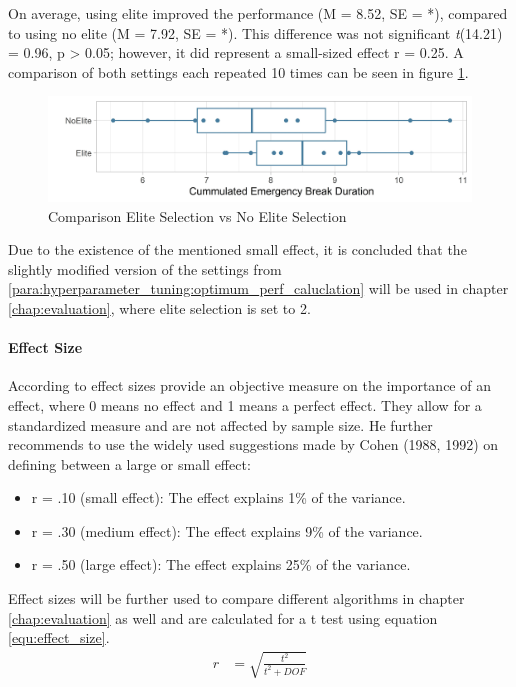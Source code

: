 On average, using elite improved the performance (M = 8.52, SE = *), compared to using no elite (M = 7.92, SE = *). This difference was not significant \textit{t}(14.21) = 0.96, p > 0.05; however, it did represent a small-sized effect r = 0.25. A comparison of both settings each repeated 10 times can be seen in figure \ref{figure:elite_comparison}.

\begin{figure}[ht] 
	\label{figure:elite_comparison}
	\includegraphics[width=1\linewidth]{simulations/evaluation/plots/elite_vs_no_elite}
	\caption{Comparison Elite Selection vs No Elite Selection}
\end{figure}

Due to the existence of the mentioned small effect, it is concluded that the slightly modified version of the settings from \ref{para:hyperparameter_tuning:optimum_perf_caluclation} will be used in chapter \ref{chap:evaluation}, where elite selection is set to 2.

\paragraph{Effect Size}
According to \cite{field_discovering_2012} effect sizes provide an objective measure on the importance of an effect, where 0 means no effect and 1 means a perfect effect. They allow for a standardized measure and are not affected by sample size. He further recommends to use the widely used suggestions made by Cohen (1988, 1992)  on defining between a large or small effect:
\begin{itemize}
	\item r = .10 (small effect): The effect explains 1\% of the variance. 
	\item r = .30 (medium effect): The effect explains 9\% of the variance. 
	\item r = .50 (large effect): The effect explains 25\% of the variance.
\end{itemize} 

Effect sizes will be further used to compare different algorithms in chapter \ref{chap:evaluation} as well and are calculated for a t test using equation \ref{equ:effect_size}.
\begin{equation} \label{equ:effect_size}
	\begin{split}
		r & = \sqrt{\frac{t^2}{t^2 + DOF}}
	\end{split}
\end{equation}




